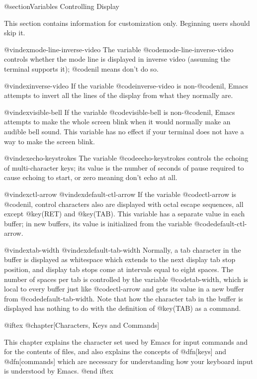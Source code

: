 {{@section{Variables Controlling Display}
 
  This section contains information for customization only.  Beginning
users should skip it.

@vindex{mode-line-inverse-video}
  The variable @code{mode-line-inverse-video} controls whether the mode
line is displayed in inverse video (assuming the terminal supports it);
@code{nil} means don't do so.

@vindex{inverse-video}
  If the variable @code{inverse-video} is non-@code{nil}, Emacs attempts
to invert all the lines of the display from what they normally are.

@vindex{visible-bell}
  If the variable @code{visible-bell} is non-@code{nil}, Emacs attempts
to make the whole screen blink when it would normally make an audible bell
sound.  This variable has no effect if your terminal does not have a way
to make the screen blink.

@vindex{echo-keystrokes}
  The variable @code{echo-keystrokes} controls the echoing of
multi-character keys; its value is the number of seconds of pause required
to cause echoing to start, or zero meaning don't echo at all.  

@vindex{ctl-arrow}
@vindex{default-ctl-arrow}
  If the variable @code{ctl-arrow} is @code{nil}, control characters
also are displayed with octal escape sequences, all except @key(RET)
and @key(TAB).  This variable has a separate value in each buffer;
in new buffers, its value is initialized from the variable
@code{default-ctl-arrow}.

@vindex{tab-width}
@vindex{default-tab-width}
  Normally, a tab character in the buffer is displayed as whitespace which
extends to the next display tab stop position, and display tab stops come
at intervals equal to eight spaces.  The number of spaces per tab is
controlled by the variable @code{tab-width}, which is local to every
buffer just like @code{ctl-arrow} and gets its value in a new buffer from
@code{default-tab-width}.  Note that how the character tab in the
buffer is displayed has nothing to do with the definition of @key(TAB)
as a command.

@iftex
@chapter[Characters, Keys and Commands]

  This chapter explains the character set used by Emacs for input commands
and for the contents of files, and also explains the concepts of
@dfn[keys] and @dfn[commands] which are necessary for understanding how
your keyboard input is understood by Emacs.
@end iftex

}}
